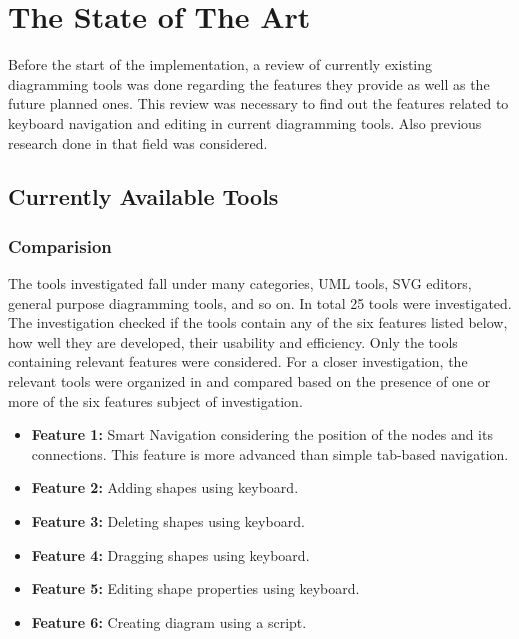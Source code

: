 \chapter{The State of The Art}
\beginchapter
Before the start of the implementation, a review of currently existing diagramming tools was done regarding the features they provide as well as the future planned ones. This review was necessary to find out the features related to keyboard navigation and editing in current diagramming tools. Also previous research done in that field was considered.

\section{Currently Available Tools}
\subsection{Comparision}
The tools investigated fall under many categories, UML tools, SVG editors, general purpose diagramming tools, and so on. In total 25 tools were investigated. The investigation checked if the tools contain any of the six features listed below, how well they are developed, their usability and efficiency. Only the tools containing relevant features were considered. For a closer investigation, the relevant tools were organized in and compared based on the presence of one or more of the six features subject of investigation.

\begin{itemize}
\item {\bf Feature 1:}
Smart Navigation considering the position of the nodes and its connections. This feature is more advanced than simple tab-based navigation.

\item {\bf Feature 2:}
Adding shapes using keyboard.

\item {\bf Feature 3:}
Deleting shapes using keyboard.

\item {\bf Feature 4:}
Dragging shapes using keyboard.

\item {\bf Feature 5:}
Editing shape properties using keyboard.

\item {\bf Feature 6:}
Creating diagram using a script.
\end{itemize}

